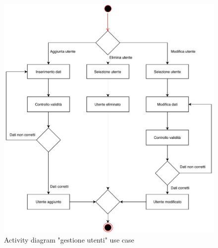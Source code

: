 \documentclass{article}
\begin{document}
\begin{figure}[H]

		\includegraphics[width=1.1\textwidth]{documenti/Activity_diagram_getioneUtenti.pdf}
		\caption{Activity diagram "gestione utenti" use case}
		\label{sequence_diagram_getioneUtenti}

	\end{figure}

\vspace{2cm}
\end{document}
